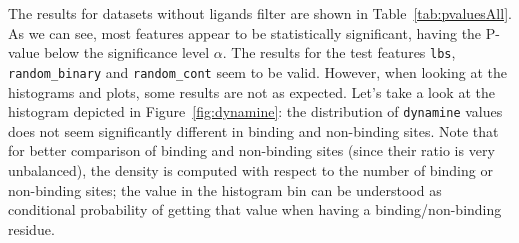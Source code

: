 The results for datasets without ligands filter are shown in Table~\ref{tab:pvaluesAll}. As we can see, most features appear to be statistically significant, having the P-value below the significance level $\alpha$. The results for the test features \texttt{lbs}, \texttt{random\_binary} and \texttt{random\_cont} seem to be valid. However, when looking at the histograms and plots, some results are not as expected. Let's take a look at the histogram depicted in Figure~\ref{fig:dynamine}: the distribution of \texttt{dynamine} values does not seem significantly different in binding and non-binding sites. Note that for better comparison of binding and non-binding sites (since their ratio is very unbalanced), the density is computed with respect to the number of binding or non-binding sites; the value in the histogram bin can be understood as conditional probability of getting that value when having a binding/non-binding residue.


